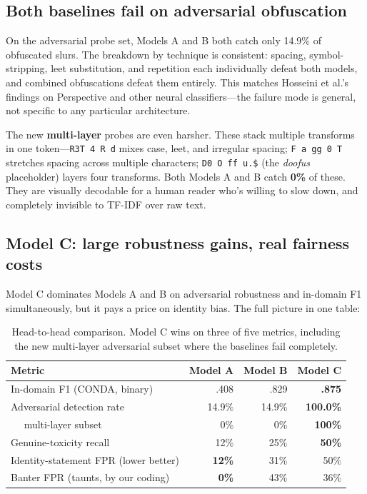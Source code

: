 \documentclass[11pt,twocolumn,letterpaper]{article}
\begin{document}
\subsection{Both baselines fail on adversarial obfuscation}

On the adversarial probe set, Models A and B both catch only 14.9\% of obfuscated slurs. The breakdown by technique is consistent: spacing, symbol-stripping, leet substitution, and repetition each individually defeat both models, and combined obfuscations defeat them entirely. This matches Hosseini et al.'s~\cite{hosseini2017} findings on Perspective and other neural classifiers---the failure mode is general, not specific to any particular architecture.

The new \textbf{multi-layer} probes are even harsher. These stack multiple transforms in one token---\texttt{R3T 4 R d} mixes case, leet, and irregular spacing; \texttt{F a gg 0 T} stretches spacing across multiple characters; \texttt{D0 O ff u.\$} (the \textit{doofus} placeholder) layers four transforms. Both Models A and B catch \textbf{0\%} of these. They are visually decodable for a human reader who's willing to slow down, and completely invisible to TF-IDF over raw text.

\subsection{Model C: large robustness gains, real fairness costs}

Model C dominates Models A and B on adversarial robustness and in-domain F1 simultaneously, but it pays a price on identity bias. The full picture in one table:

\begin{table}[!t]
\centering
\small
\begin{tabular}{lrrr}
\toprule
Metric & Model A & Model B & Model C \\
\midrule
In-domain F1 (CONDA, binary)  & .408 & .829 & \textbf{.875} \\
Adversarial detection rate    & 14.9\% & 14.9\% & \textbf{100.0\%} \\
$\quad$ multi-layer subset    & 0\% & 0\% & \textbf{100\%} \\
Genuine-toxicity recall       & 12\% & 25\% & \textbf{50\%} \\
Identity-statement FPR (lower better) & \textbf{12\%} & 31\% & 50\% \\
Banter FPR (taunts, by our coding)    & \textbf{0\%} & 43\% & 36\% \\
\bottomrule
\end{tabular}
\caption{Head-to-head comparison. Model C wins on three of five metrics, including the new multi-layer adversarial subset where the baselines fail completely.}
\end{table}
\end{document}
